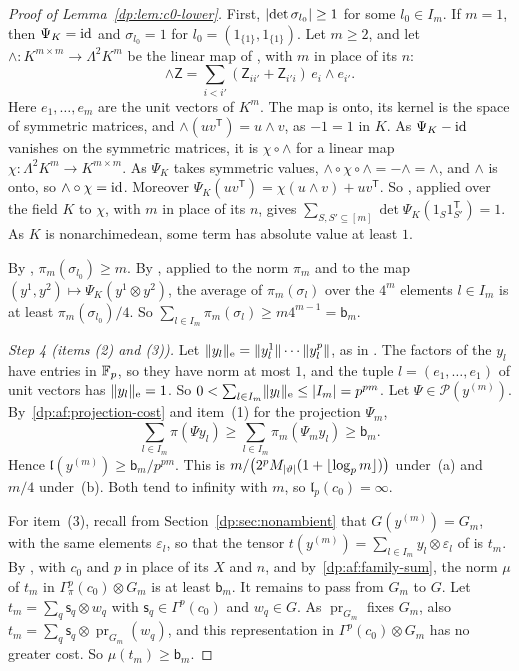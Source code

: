 \begin{proof}[Proof of Lemma~\ref{dp:lem:c0-lower}]
First, $\lvert \det\sigma_{l_0}\rvert\ge1$ for some $l_0\in I_m$. If $m=1$, then $\Psi_K=\mathrm{id}$ and $\sigma_{l_0}=1$ for $l_0=(1_{\{1\}},1_{\{1\}})$. Let $m\ge2$, and let $\wedge\colon K^{m\times m}\to\Lambda^2K^m$ be the linear map of \cite[Theorem~7.20(1)]{I}, with $m$ in place of its $n$:
\[
 \wedge\mathsf Z=\sum_{i<i'}(\mathsf Z_{ii'}+\mathsf Z_{i'i})\,e_i\wedge e_{i'}.
\]
Here $e_1,\dots,e_m$ are the unit vectors of $K^m$. The map is onto, its kernel is the space of symmetric matrices, and $\wedge(uv^{\mathsf T})=u\wedge v$, as $-1=1$ in $K$. As $\Psi_K-\mathrm{id}$ vanishes on the symmetric matrices, it is $\chi\circ\wedge$ for a linear map $\chi\colon\Lambda^2K^m\to K^{m\times m}$. As $\Psi_K$ takes symmetric values, $\wedge\circ\chi\circ\wedge=-\wedge=\wedge$, and $\wedge$ is onto, so $\wedge\circ\chi=\mathrm{id}$. Moreover $\Psi_K(uv^{\mathsf T})=\chi(u\wedge v)+uv^{\mathsf T}$. So \cite[Proposition~N.12]{I}, applied over the field $K$ to $\chi$, with $m$ in place of its $n$, gives $\sum_{S,S'\subseteq[m]}\det\Psi_K(1_S1_{S'}^{\mathsf T})=1$. As $K$ is nonarchimedean, some term has absolute value at least $1$.

By \cite[Lemma~N.15(2)]{I}, $\pi_m(\sigma_{l_0})\ge m$. By \cite[Lemma~Q.6(3)]{I}, applied to the norm $\pi_m$ and to the map $(y^1,y^2)\mapsto\Psi_K(y^1\otimes y^2)$, the average of $\pi_m(\sigma_l)$ over the $4^m$ elements $l\in I_m$ is at least $\pi_m(\sigma_{l_0})/4$. So $\sum_{l\in I_m}\pi_m(\sigma_l)\ge m4^{m-1}=\mathsf b_m$.

\emph{Step 4 (items (2) and (3)).} Let $\lVert y_l\rVert_{\rm e}=\lVert y_l^1\rVert\cdots\lVert y_l^p\rVert$, as in \cite[Definition~14.15]{I}. The factors of the $y_l$ have entries in $\mathbb F_p$, so they have norm at most $1$, and the tuple $l=(e_1,\dots,e_1)$ of unit vectors has $\lVert y_l\rVert_{\rm e}=1$. So $0<\sum_{l\in I_m}\lVert y_l\rVert_{\rm e}\le\lvert I_m\rvert=p^{pm}$. Let $\Psi\in\mathcal P(y^{(m)})$. By~\eqref{dp:af:projection-cost} and item~(1) for the projection $\Psi_m$,
\begin{equation}\label{dp:af:family-sum}
 \sum_{l\in I_m}\pi(\Psi y_l)\ge\sum_{l\in I_m}\pi_m(\Psi_my_l)\ge\mathsf b_m.
\end{equation}
Hence $\mathfrak l(y^{(m)})\ge\mathsf b_m/p^{pm}$. This is $m/\bigl(2^pM_{\lvert \vartheta\rvert}(1+\lfloor\log_pm\rfloor)\bigr)$ under~(a) and $m/4$ under~(b). Both tend to infinity with $m$, so $\mathfrak l_p(c_0)=\infty$.

For item~(3), recall from Section~\ref{dp:sec:nonambient} that $G(y^{(m)})=G_m$, with the same elements $\varepsilon_l$, so that the tensor $t(y^{(m)})=\sum_{l\in I_m}y_l\otimes\varepsilon_l$ of \cite[Definition~14.15]{I} is $t_m$. By \cite[Lemma~Q.7(1)]{I}, with $c_0$ and $p$ in place of its $X$ and $n$, and by~\eqref{dp:af:family-sum}, the norm $\mu$ of $t_m$ in $\Gamma^p_\pi(c_0)\otimes G_m$ is at least $\mathsf b_m$. It remains to pass from $G_m$ to $G$. Let $t_m=\sum_q\mathsf s_q\otimes w_q$ with $\mathsf s_q\in\Gamma^p(c_0)$ and $w_q\in G$. As $\operatorname{pr}_{G_m}$ fixes $G_m$, also $t_m=\sum_q\mathsf s_q\otimes\operatorname{pr}_{G_m}(w_q)$, and this representation in $\Gamma^p(c_0)\otimes G_m$ has no greater cost. So $\mu(t_m)\ge\mathsf b_m$.
\end{proof}

